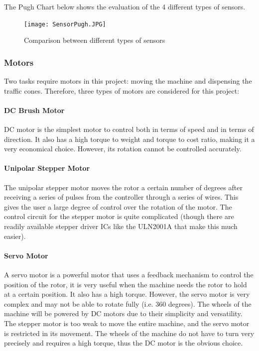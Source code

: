 \documentclass[11pt]{report}
\begin{document}
The Pugh Chart below shows the evaluation of the 4 different types of sensors.

\begin{figure}[h!]
  \begin{center}
    \texttt{[image: SensorPugh.JPG]}
  \end{center}
  \caption{Comparison between different types of sensors}
\end{figure}

\subsubsection{Motors}

Two tasks require motors in this project: moving the machine and dispensing the traffic cones. Therefore, three types of motors are considered for this project:
\paragraph{DC Brush Motor}
DC motor is the simplest motor to control both in terms of speed and in terms of direction. It also has a high torque to weight and torque to cost ratio, making it a very economical choice. However, its rotation cannot be controlled accurately.
\paragraph{Unipolar Stepper Motor}
The unipolar stepper motor moves the rotor a certain number of degrees after receiving a series of pulses from the controller through a series of wires. This gives the user a large degree of control over the rotation of the motor. The control circuit for the stepper motor is quite complicated (though there are readily available stepper driver ICs like the ULN2001A that make this much easier). 
\paragraph{Servo Motor}
A servo motor is a powerful motor that uses a feedback mechanism to control the position of the rotor, it is very useful when the machine needs the rotor to hold at a certain position. It also has a high torque. However, the servo motor is very complex and may not be able to rotate fully (i.e. 360 degrees).
\newline\newline
The wheels of the machine will be powered by DC motors due to their simplicity and versatility. The stepper motor is too weak to move the entire machine, and the servo motor is restricted in its movement. The wheels of the machine do not have to turn very precisely and requires a high torque, thus the DC motor is the obvious choice.
\end{document}
